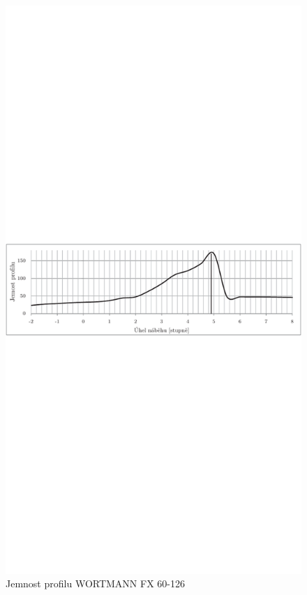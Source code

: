 	\begin{figure}[H]
			\centering
			\includegraphics[]{obrazky/grafy/wortmannjp}
			\caption{Jemnost profilu WORTMANN FX 60-126}
			\label{profil:wortj}
	\end{figure}
